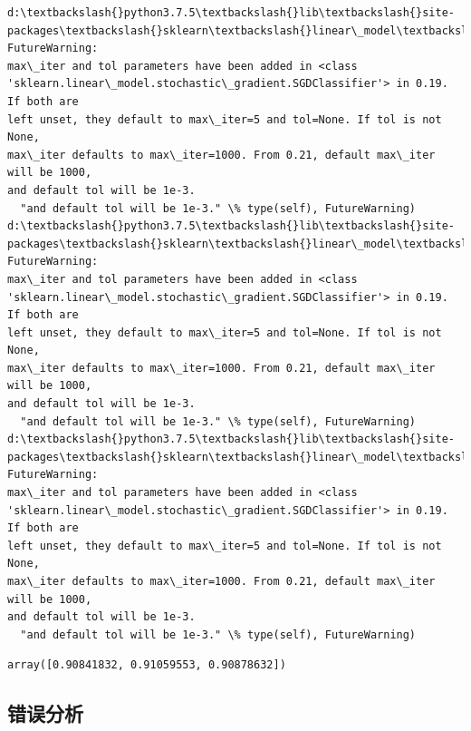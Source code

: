 \documentclass[11pt]{article}
\makeatletter
\newcommand{\boxspacing}{\kern\kvtcb@left@rule\kern\kvtcb@boxsep}
\newcommand{\prompt}[4]{
        \ttfamily\llap{{\color{#2}[#3]:\hspace{3pt}#4}}\vspace{-\baselineskip}
    }
\makeatother
\begin{document}
    \begin{Verbatim}[commandchars=\\\{\}]
d:\textbackslash{}python3.7.5\textbackslash{}lib\textbackslash{}site-
packages\textbackslash{}sklearn\textbackslash{}linear\_model\textbackslash{}stochastic\_gradient.py:128: FutureWarning:
max\_iter and tol parameters have been added in <class
'sklearn.linear\_model.stochastic\_gradient.SGDClassifier'> in 0.19. If both are
left unset, they default to max\_iter=5 and tol=None. If tol is not None,
max\_iter defaults to max\_iter=1000. From 0.21, default max\_iter will be 1000,
and default tol will be 1e-3.
  "and default tol will be 1e-3." \% type(self), FutureWarning)
d:\textbackslash{}python3.7.5\textbackslash{}lib\textbackslash{}site-
packages\textbackslash{}sklearn\textbackslash{}linear\_model\textbackslash{}stochastic\_gradient.py:128: FutureWarning:
max\_iter and tol parameters have been added in <class
'sklearn.linear\_model.stochastic\_gradient.SGDClassifier'> in 0.19. If both are
left unset, they default to max\_iter=5 and tol=None. If tol is not None,
max\_iter defaults to max\_iter=1000. From 0.21, default max\_iter will be 1000,
and default tol will be 1e-3.
  "and default tol will be 1e-3." \% type(self), FutureWarning)
d:\textbackslash{}python3.7.5\textbackslash{}lib\textbackslash{}site-
packages\textbackslash{}sklearn\textbackslash{}linear\_model\textbackslash{}stochastic\_gradient.py:128: FutureWarning:
max\_iter and tol parameters have been added in <class
'sklearn.linear\_model.stochastic\_gradient.SGDClassifier'> in 0.19. If both are
left unset, they default to max\_iter=5 and tol=None. If tol is not None,
max\_iter defaults to max\_iter=1000. From 0.21, default max\_iter will be 1000,
and default tol will be 1e-3.
  "and default tol will be 1e-3." \% type(self), FutureWarning)
    \end{Verbatim}

            \begin{tcolorbox}[breakable, size=fbox, boxrule=.5pt, pad at break*=1mm, opacityfill=0]
\prompt{Out}{outcolor}{62}{\boxspacing}
\begin{Verbatim}[commandchars=\\\{\}]
array([0.90841832, 0.91059553, 0.90878632])
\end{Verbatim}
\end{tcolorbox}
        
    \hypertarget{ux9519ux8befux5206ux6790}{%
\subsection{错误分析}\label{ux9519ux8befux5206ux6790}}
\end{document}
